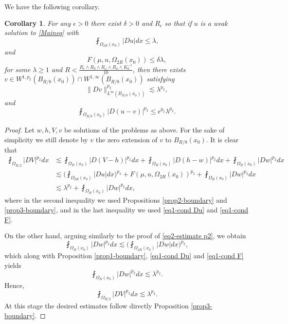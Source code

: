 \documentclass[a4paper,10pt]{amsart}
\newtheorem{cor}[thm]{Corollary}
\newcommand{\lesi}{\lesssim}
\newcommand{\f}{\frac}
\newcommand{\om}{\omega}
\newcommand{\Om}{\Omega}
\newcommand{\vc}{\infty}
\begin{document}
We have the following corollary.
\begin{cor}
		\label{cor-boundary}
		For any $\epsilon>0$ there exist $\delta>0$ and $R_\epsilon$ so that  if $u$ is a weak solution to \eqref{Maineq} with
		\begin{equation}\label{eq1-cond Du}
		\fint_{\Om_{2R}(x_0)}|Du|dx\leq \lambda,
		\end{equation}
		and
		\begin{equation}\label{eq1-cond F}
		F(\mu,u,\Om_{2R}(x_0))\leq \delta\lambda,
		\end{equation}
		for some $\lambda\geq 1$ and $R<\f{R_\epsilon\wedge R_0\wedge R_\om\wedge R_a\wedge K_0^{-1}}{10}$, then there exists $v\in W^{1,p_2}(B_{R/8}(x_0))\cap W^{1,\vc}(B_{R/8}(x_0))$ satisfying
		\begin{equation}\label{eq1-cor}
		\|Dv\|^{p_2}_{L^{\vc}(B_{R/8}(x_0))}\lesi  \lambda^{p_2},
		\end{equation}
		and
		\begin{equation}
		\label{eq2-cor}
				\fint_{\Om_{R/8}(x_0)}|D(u-v)|^{p_2}\leq \epsilon^{p_2} \lambda^{p_2}.
		\end{equation}
				\end{cor}
\begin{proof}
	Let $w, h, V, v$ be solutions of the problems as above. For the sake of simplicity we still denote by $v$ the zero extension of $v$ to $B_{R/8}(x_0)$.
	It is clear that
	$$
	\begin{aligned}
	\fint_{\Om_{R/2}}|DV|^{p_2}dx&\lesi \fint_{\Om_R(x_0)}|D(V-h)|^{p_2}dx+\fint_{\Om_R(x_0)}|D(h-w)|^{p_2}dx+\fint_{\Om_R(x_0)}|Dw|^{p_2}dx\\
	&\lesi \Big(\fint_{\Om_{2R}(x_0)}|Du|dx\Big)^{p_2} + F(\mu,u,\Om_{2R}(x_0))^{p_2}+\fint_{\Om_R(x_0)}|Dw|^{p_2}dx\\
	&\lesi \lambda^{p_2}+\fint_{\Om_R(x_0)}|Dw|^{p_2}dx,
	\end{aligned}
	$$
	where in the second inequality we used Propositions \ref{prop2-boundary} and \ref{prop3-boundary}, and in the last inequality we used \eqref{eq1-cond Du} and \eqref{eq1-cond F}.
	
	On the other hand, arguing similarly to the proof of \eqref{eq2-estimate p2}, we obtain
	$$
	\fint_{\Om_R(x_0)}|Dw|^{p_2}dx\lesi \Big(\fint_{\Om_{2R}(x_0)}|Dw|dx\Big)^{p_2},
	$$
	which along with Proposition \ref{prop1-boundary}, \eqref{eq1-cond Du} and \eqref{eq1-cond F} yields
	$$
	\fint_{\Om_R(x_0)}|Dw|^{p_2}dx\lesi \lambda^{p_2}.
	$$
	Hence,
	$$
	\fint_{\Om_{R/2}}|DV|^{p_2}dx\lesi \lambda^{p_2}.
	$$
		At this stage the desired estimates follow directly Proposition \ref{prop3-boundary}.
\end{proof}
\end{document}
